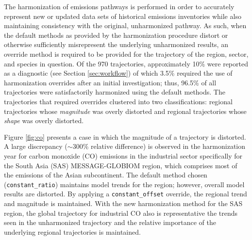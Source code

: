 \documentclass[review]{elsarticle}
\newcommand{\code}[1]{\lstinline[basicstyle=\ttfamily\color{black}]|#1|}
\begin{document}
The harmonization of emissions pathways is performed in order to accurately
represent new or updated data sets of historical emissions inventories while also
maintaining consistency with the original, unharmonized pathway. As such, when
the default methods as provided by the harmonization procedure distort or
otherwise sufficiently misrepresent the underlying unharmonized results, an
override method is required to be provided for the trajectory of the region,
sector, and species in question. Of the 970 trajectories, approximately 10\%
were reported as a diagnostic (see Section \ref{sec:workflow}) of which 3.5\%
required the use of harmonization overrides after an initial investigation;
thus, 96.5\% of all trajectories were satisfactorily harmonized using the
default methods. The trajectories that required overrides clustered into two
classifications: regional trajectories whose \textit{magnitude} was overly
distorted and regional trajectories whose \textit{shape} was overly distorted.

Figure \ref{fig:co} presents a case in which the magnitude of a trajectory is
distorted. A large discrepancy ($\sim$300\% relative difference) is observed in
the harmonization year for carbon monoxide (CO) emissions in the industrial
sector specifically for the South Asia (SAS) MESSAGE-GLOBIOM region, which
comprises most of the emissions of the Asian subcontinent. The default method
chosen (\code{constant_ratio}) maintains model trends for the region; however,
overall model results are distorted. By applying a \code{constant_offset}
override, the regional trend and magnitude is maintained. With the new
harmonization method for the SAS region, the global trajectory for industrial CO
also is representative the trends seen in the unharmonized trajectory and the
relative importance of the underlying regional trajectories is maintained.
\end{document}
